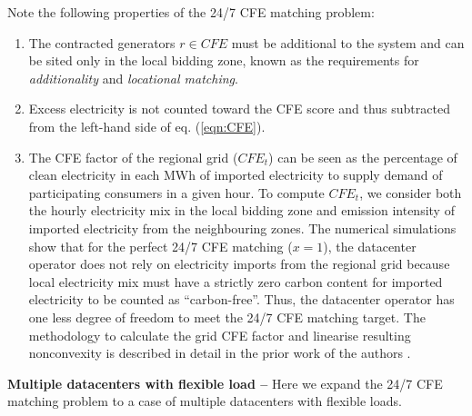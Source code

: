 Note the following properties of the 24/7 CFE matching problem:

\begin{enumerate}
    \item The contracted generators $r\in CFE$ must be additional to the system and can be sited only in the local bidding zone, known as the requirements for \textit{additionality} and \textit{locational matching}.
    \item Excess electricity is not counted toward the CFE score and thus subtracted from the left-hand side of eq. (\ref{eqn:CFE}).
    \item The CFE factor of the regional grid ($CFE_t$) can be seen as the percentage of clean electricity in each MWh of imported electricity to supply demand of participating consumers in a given hour.
    To compute $CFE_t$, we consider both the hourly electricity mix in the local bidding zone and emission intensity of imported electricity from the neighbouring zones.
    The numerical simulations show that for the perfect 24/7 CFE matching ($x=1$), the datacenter operator does not rely on electricity imports from the regional grid because local electricity mix must have a strictly zero carbon content for imported electricity to be counted as \enquote{carbon-free}.
    Thus, the datacenter operator has one less degree of freedom to meet the 24/7 CFE matching target.
    The methodology to calculate the grid CFE factor and linearise resulting nonconvexity is described in detail in the prior work of the authors \cite{riepin-zenodo-systemlevel247}.
\end{enumerate}

\textbf{Multiple datacenters with flexible load --} Here we expand the 24/7 CFE matching problem to a case of multiple datacenters with flexible loads.

